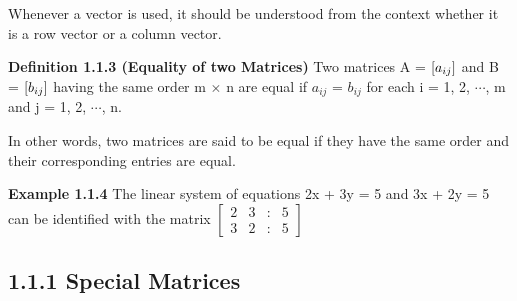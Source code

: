 \documentclass{book}
\begin{document}
Whenever a vector is used, it should be understood from the context whether it is a row vector or a column vector.

\textbf{Definition 1.1.3 (Equality of two Matrices)} Two matrices A = $\small[a_{ij}\small]$  and B = $\small[b_{ij}\small]$  having the same order  m $\times$ n are equal if $a_{ij}$ = $b_{ij}$ for each i = 1, 2, $\cdots$, m and j = 1, 2, $\cdots$, n. 

In other words, two matrices are said to be equal if they have the same order and their corresponding
entries are equal.

\textbf{Example 1.1.4} The linear system of equations 2x + 3y = 5 and 3x + 2y = 5 can be identified with the matrix $ \begin{bmatrix}
	2 & 3 & : & 5 \\
	3 & 2 & : & 5
\end{bmatrix} $

\subsection*{1.1.1 Special Matrices} 
\end{document}
